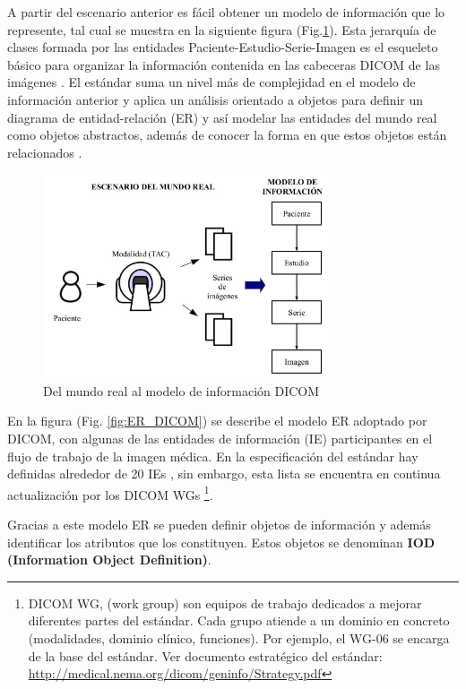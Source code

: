 A partir del escenario anterior es fácil obtener un modelo de información que lo represente, tal cual se muestra en la siguiente figura (Fig.\ref{fig:mundoReal_modelo}). Esta jerarquía de clases formada por las entidades Paciente-Estudio-Serie-Imagen es el esqueleto básico para organizar la información contenida en las cabeceras DICOM de las imágenes \cite{10}. El estándar suma un nivel más de complejidad en el modelo de información anterior y aplica un análisis orientado a objetos para definir un diagrama de entidad-relación (ER) y así modelar las entidades del mundo real como objetos abstractos, además de conocer la forma en que estos objetos están relacionados \cite{13}.

\begin{figure}[!h]
\begin{center}
\includegraphics[width=0.75\textwidth]{images/mundoReal_modelo.jpg}
\caption{Del mundo real al modelo de información DICOM}
\label{fig:mundoReal_modelo}
\end{center}
\end{figure}

En la figura (Fig. \ref{fig:ER_DICOM}) se describe el modelo \acs{ER} adoptado por \acs{DICOM}, con algunas de las entidades de información (\acs{IE}) participantes en el flujo de trabajo de la imagen médica. En la especificación del estándar hay definidas alrededor de 20 IEs \cite{13}, sin embargo, esta lista se encuentra en continua actualización por los DICOM WGs \footnote{DICOM WG, (work group) son equipos de trabajo dedicados a mejorar diferentes partes del estándar. Cada grupo atiende a un dominio en concreto (modalidades, dominio clínico, funciones). Por ejemplo, el WG-06 se encarga de la base del estándar. Ver documento estratégico del estándar: \url{http://medical.nema.org/dicom/geninfo/Strategy.pdf}}.

Gracias a este modelo ER se pueden definir objetos de información y además identificar los atributos que los constituyen. Estos objetos se denominan \textbf{\acs{IOD} (Information Object Definition)}.

